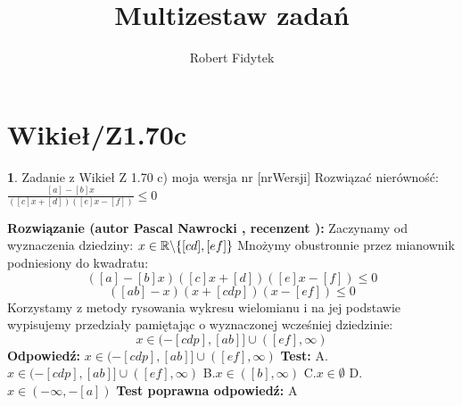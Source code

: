 \documentclass[12pt, a4paper]{article}
\title{Multizestaw zadań}
\author{Robert Fidytek}
\date{}
\theoremstyle{definition} %
\newtheorem{zad}{}
\newcommand{\kategoria}[1]{\section{#1}} %
\newcommand{\zadStart}[1]{\begin{zad}#1\newline} %
\newcommand{\zadStop}{\end{zad}}   %
\newcommand{\rozwStart}[2]{\noindent \textbf{Rozwiązanie (autor #1 , recenzent #2): }\newline} %
\newcommand{\odpStart}{\noindent \textbf{Odpowiedź:}\newline}    %
\newcommand{\odpStop}{\newline}                                             %
\newcommand{\testStart}{\noindent \textbf{Test:}\newline} %
\newcommand{\testStop}{\newline} %
\newcommand{\kluczStart}{\noindent \textbf{Test poprawna odpowiedź:}\newline} %
\newcommand{\kluczStop}{\newline} %
\begin{document}
\maketitle


\kategoria{Wikieł/Z1.70c}
\zadStart{Zadanie z Wikieł Z 1.70 c) moja wersja nr [nrWersji]}
Rozwiązać nierówność: $\frac{[a]-[b]x}{([c]x+[d])([e]x-[f])}\leq0$
\zadStop
\rozwStart{Pascal Nawrocki}{}
Zaczynamy od wyznaczenia dziedziny: $x\in\mathbb{R}\symbol{92}\{[cd],[ef]\}$
Mnożymy obustronnie przez mianownik podniesiony do kwadratu:
$$([a]-[b]x)([c]x+[d])([e]x-[f])\leq0$$
$$([ab]-x)(x+[cdp])(x-[ef])\leq0$$
Korzystamy z metody rysowania wykresu wielomianu i na jej podstawie wypisujemy przedziały pamiętając o wyznaczonej wcześniej dziedzinie:
$$x\in(-[cdp],[ab]]\cup([ef],\infty)$$
\odpStart
$x\in(-[cdp],[ab]]\cup([ef],\infty)$
\odpStop
\testStart
A.$x\in(-[cdp],[ab]]\cup([ef],\infty)$
B.$x\in([b],\infty)$
C.$x\in\emptyset$
D.$x\in(-\infty,-[a])$
\testStop
\kluczStart
A
\kluczStop
\end{document}
